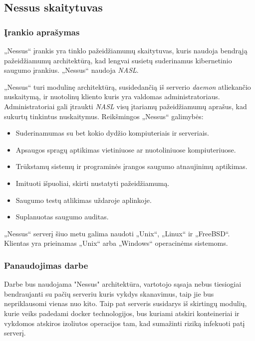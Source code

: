\documentclass[a4paper,12pt,fleqn]{article}
\begin{document}
\subsection{Nessus skaitytuvas}
\label{sec:example}

\subsubsection{Įrankio aprašymas}

„Nessus“ įrankis yra tinklo pažeidžiamumų skaitytuvas, kuris naudoja bendrąją pažeidžiamumų architektūrą, kad lengvai susietų suderinamus kibernetinio saugumo įrankius. „Nessus“ naudoja \textit{NASL}.

„Nessus“ turi modulinę architektūrą, susidedančią iš serverio \textit{daemon} atliekančio nuskaitymą, ir nuotolinų kliento kuris yra valdomas administratoriaus. Administratoriai gali įtraukti \textit{NASL} visų įtariamų pažeidžiamumų aprašus, kad sukurtų tinkintus nuskaitymus. Reikšmingos „Nessus“ galimybės:

\begin{itemize}
	\item Suderinamumas su bet kokio dydžio kompiuteriais ir serveriais.
	\item Apsaugos spragų aptikimas vietiniuose ar nuotoliniuose kompiuteriuose.
	\item Trūkstamų sistemų ir programinės įrangos saugumo atnaujinimų aptikimas.
	\item Imituoti išpuoliai, skirti nustatyti pažeidžiamumą.
	\item Saugumo testų atlikimas uždaroje aplinkoje.
	\item Suplanuotas saugumo auditas.
\end{itemize}

„Nessus“ serverį šiuo metu galima naudoti „Unix“, „Linux“ ir „FreeBSD“. Klientas yra prieinamas „Unix“ arba „Windows“ operacinėms sistemoms.

\subsubsection{Panaudojimas darbe}

Darbe bus naudojama "Nessus" architektūra, vartotojo sąsaja nebus tiesiogiai bendraujanti su pačių serveriu kuris vykdys skanavimus, taip jie bus nepriklausomi vienas nuo kito. Taip pat serveris susidarys iš skirtingų modulių, kurie veiks padedami docker technologijos, bus kuriami atskiri konteineriai ir vykdomos atskiros izoliutos operacijos tam, kad sumažinti riziką infekuoti patį serverį.
\end{document}
